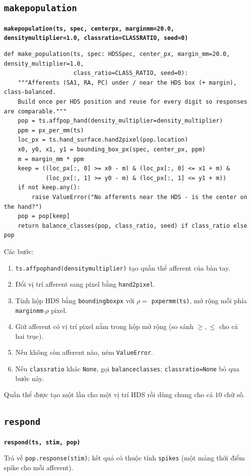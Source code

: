 \documentclass[11pt,a4paper]{article}
\renewcommand{\_}{\textunderscore\hspace{0pt}}
\newcommand{\code}[1]{\texttt{#1}}
\newcommand{\sig}[1]{\par\smallskip\noindent\textbf{\texttt{#1}}\par\nopagebreak}
\begin{document}
\subsection{\texttt{make\_population}}
\sig{make\_population(ts, spec, center\_px, margin\_mm=20.0, density\_multiplier=1.0, class\_ratio=CLASS\_RATIO, seed=0)}
\begin{lstlisting}
def make_population(ts, spec: HDSSpec, center_px, margin_mm=20.0, density_multiplier=1.0,
                    class_ratio=CLASS_RATIO, seed=0):
    """Afferents (SA1, RA, PC) under / near the HDS box (+ margin), class-balanced.
    Build once per HDS position and reuse for every digit so responses are comparable."""
    pop = ts.affpop_hand(density_multiplier=density_multiplier)
    ppm = px_per_mm(ts)
    loc_px = ts.hand_surface.hand2pixel(pop.location)
    x0, y0, x1, y1 = bounding_box_px(spec, center_px, ppm)
    m = margin_mm * ppm
    keep = ((loc_px[:, 0] >= x0 - m) & (loc_px[:, 0] <= x1 + m) &
            (loc_px[:, 1] >= y0 - m) & (loc_px[:, 1] <= y1 + m))
    if not keep.any():
        raise ValueError("No afferents near the HDS - is the center on the hand?")
    pop = pop[keep]
    return balance_classes(pop, class_ratio, seed) if class_ratio else pop
\end{lstlisting}
Các bước:
\begin{enumerate}
\item \code{ts.affpop\_hand(density\_multiplier)} tạo quần thể afferent của bàn tay.
\item Đổi vị trí afferent sang pixel bằng \code{hand2pixel}.
\item Tính hộp HDS bằng \code{bounding\_box\_px} với $\rho=$ \code{px\_per\_mm(ts)}, mở rộng mỗi phía \code{margin\_mm}$\cdot\rho$ pixel.
\item Giữ afferent có vị trí pixel nằm trong hộp mở rộng (so sánh $\ge,\le$ cho cả hai trục).
\item Nếu không còn afferent nào, ném \code{ValueError}.
\item Nếu \code{class\_ratio} khác \code{None}, gọi \code{balance\_classes}; \code{class\_ratio=None} bỏ qua bước này.
\end{enumerate}
Quần thể được tạo một lần cho một vị trí HDS rồi dùng chung cho cả $10$ chữ số.

\subsection{\texttt{respond}}
\sig{respond(ts, stim, pop)}
Trả về \code{pop.response(stim)}; kết quả có thuộc tính \code{spikes} (một mảng thời điểm spike cho mỗi afferent).
\end{document}
